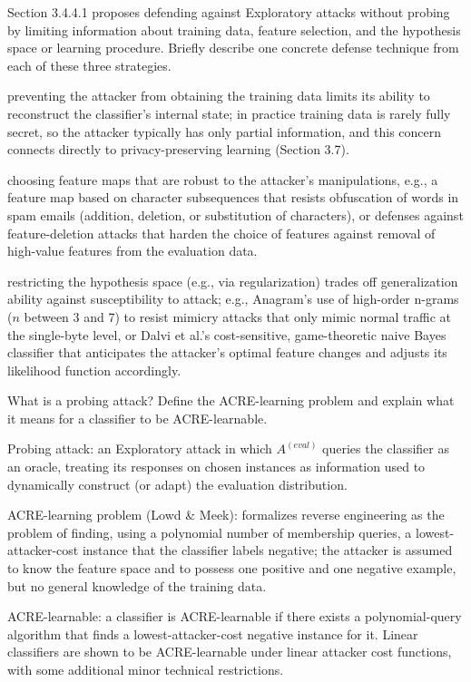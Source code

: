 \documentclass[10pt]{extarticle}
\newcommand{\resposta}[1]{\par\smallskip\noindent #1}
\begin{document}
\begin{questoes}
\item Section 3.4.4.1 proposes defending against Exploratory attacks without probing by limiting information about training data, feature selection, and the hypothesis space or learning procedure. Briefly describe one concrete defense technique from each of these three strategies.

\resposta{
\begin{topicos}
\item[Training data:] preventing the attacker from obtaining the training data limits its ability to reconstruct the classifier's internal state; in practice training data is rarely fully secret, so the attacker typically has only partial information, and this concern connects directly to privacy-preserving learning (Section 3.7).
\item[Feature selection:] choosing feature maps that are robust to the attacker's manipulations, e.g., a feature map based on character subsequences that resists obfuscation of words in spam emails (addition, deletion, or substitution of characters), or defenses against feature-deletion attacks that harden the choice of features against removal of high-value features from the evaluation data.
\item[Hypothesis space / learning procedure:] restricting the hypothesis space (e.g., via regularization) trades off generalization ability against susceptibility to attack; e.g., Anagram's use of high-order n-grams ($n$ between 3 and 7) to resist mimicry attacks that only mimic normal traffic at the single-byte level, or Dalvi et al.'s cost-sensitive, game-theoretic naive Bayes classifier that anticipates the attacker's optimal feature changes and adjusts its likelihood function accordingly.
\end{topicos}
}

\item What is a probing attack? Define the ACRE-learning problem and explain what it means for a classifier to be ACRE-learnable.

\resposta{
\begin{topicos}
\item Probing attack: an Exploratory attack in which $A^{(eval)}$ queries the classifier as an oracle, treating its responses on chosen instances as information used to dynamically construct (or adapt) the evaluation distribution.
\item ACRE-learning problem (Lowd \& Meek): formalizes reverse engineering as the problem of finding, using a polynomial number of membership queries, a lowest-attacker-cost instance that the classifier labels negative; the attacker is assumed to know the feature space and to possess one positive and one negative example, but no general knowledge of the training data.
\item ACRE-learnable: a classifier is ACRE-learnable if there exists a polynomial-query algorithm that finds a lowest-attacker-cost negative instance for it. Linear classifiers are shown to be ACRE-learnable under linear attacker cost functions, with some additional minor technical restrictions.
\end{topicos}
}


\end{questoes}
\end{document}
